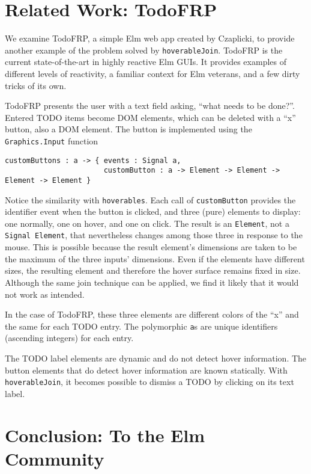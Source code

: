 \documentclass{article}
\begin{document}
\section{Related Work: TodoFRP}\label{related-work-todofrp}

We examine TodoFRP, \cite{todoFRP} a simple
Elm web app created by Czaplicki, to provide another example of the problem
solved by \texttt{hoverableJoin}. TodoFRP is the current state-of-the-art in highly
reactive Elm GUIs. It provides examples of different levels of
reactivity, a familiar context for Elm veterans, and a few dirty tricks
of its own.

TodoFRP presents the user with a text field asking, ``what needs to be
done?''. Entered TODO items become DOM elements, which can be deleted
with a ``x'' button, also a DOM element. The button is implemented using
the \texttt{Graphics.Input} function

\begin{verbatim}
customButtons : a -> { events : Signal a,
                       customButton : a -> Element -> Element -> Element -> Element }
\end{verbatim}

Notice the similarity with \texttt{hoverables}. Each call of
\texttt{customButton} provides the identifier event when the button is
clicked, and three (pure) elements to display: one normally, one on
hover, and one on click. The result is an \texttt{Element}, not a
\texttt{Signal Element}, that nevertheless changes among those three in
response to the mouse. This is possible because the result element's
dimensions are taken to be the maximum of the three inputs' dimensions.
Even if the elements have different sizes, the resulting element and
therefore the hover surface remains fixed in size. Although the same
join technique can be applied, we find it likely that it would not work
as intended.

In the case of TodoFRP, these three elements are different colors of the ``x''
and the same for each TODO entry. The polymorphic \texttt{a}s are unique
identifiers (ascending integers) for each entry.

The TODO label elements are dynamic and do not detect hover information.
The button elements that do detect hover information are known
statically. With \texttt{hoverableJoin}, it becomes possible to
dismiss a TODO by clicking on its text label.

\section{Conclusion: To the Elm
Community}\label{conclusion}
\end{document}
